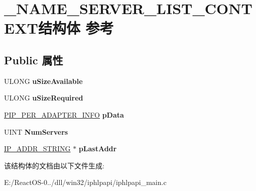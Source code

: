 \hypertarget{struct___n_a_m_e___s_e_r_v_e_r___l_i_s_t___c_o_n_t_e_x_t}{}\section{\+\_\+\+N\+A\+M\+E\+\_\+\+S\+E\+R\+V\+E\+R\+\_\+\+L\+I\+S\+T\+\_\+\+C\+O\+N\+T\+E\+X\+T结构体 参考}
\label{struct___n_a_m_e___s_e_r_v_e_r___l_i_s_t___c_o_n_t_e_x_t}
\subsection*{Public 属性}
\begin{DoxyCompactItemize}
\item 
\mbox{\label{struct___n_a_m_e___s_e_r_v_e_r___l_i_s_t___c_o_n_t_e_x_t_a830844e39b0199e1009ecf1a4451211a}} 
U\+L\+O\+NG {\bfseries u\+Size\+Available}
\item 
\mbox{\label{struct___n_a_m_e___s_e_r_v_e_r___l_i_s_t___c_o_n_t_e_x_t_a46e9b8d35eb0a18842d575d9e16b8158}} 
U\+L\+O\+NG {\bfseries u\+Size\+Required}
\item 
\mbox{\label{struct___n_a_m_e___s_e_r_v_e_r___l_i_s_t___c_o_n_t_e_x_t_ac262ff4a8d37b6689f9456f7b39c0456}} 
\hyperlink{struct___i_p___p_e_r___a_d_a_p_t_e_r___i_n_f_o}{P\+I\+P\+\_\+\+P\+E\+R\+\_\+\+A\+D\+A\+P\+T\+E\+R\+\_\+\+I\+N\+FO} {\bfseries p\+Data}
\item 
\mbox{\label{struct___n_a_m_e___s_e_r_v_e_r___l_i_s_t___c_o_n_t_e_x_t_ad0eb36afba05a1893ece9f853c359e8a}} 
U\+I\+NT {\bfseries Num\+Servers}
\item 
\mbox{\label{struct___n_a_m_e___s_e_r_v_e_r___l_i_s_t___c_o_n_t_e_x_t_af70c4ab74342538dcc46388a8d366c7e}} 
\hyperlink{struct___i_p___a_d_d_r___s_t_r_i_n_g}{I\+P\+\_\+\+A\+D\+D\+R\+\_\+\+S\+T\+R\+I\+NG} $\ast$ {\bfseries p\+Last\+Addr}
\end{DoxyCompactItemize}


该结构体的文档由以下文件生成\+:\begin{DoxyCompactItemize}
\item 
E\+:/\+React\+O\+S-\/0../dll/win32/iphlpapi/iphlpapi\+\_\+main.\+c\end{DoxyCompactItemize}
